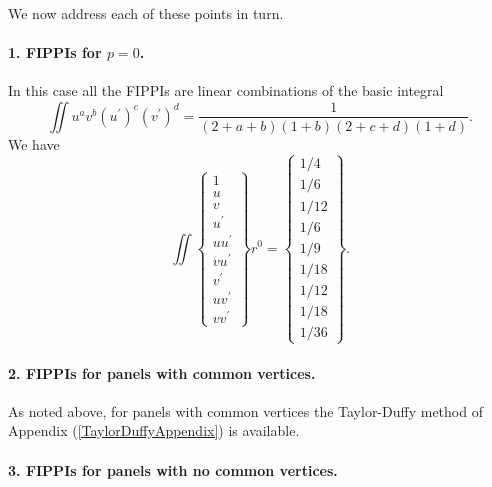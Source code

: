 \documentclass[letterpaper]{article}
\begin{document}
We now address each of these points in turn. 

\paragraph{1. FIPPIs for $p=0$.} 

In this case all the FIPPIs are linear combinations of the 
basic integral
$$ \iint u^a v^b (u^\prime)^c (v^\prime)^d 
   = 
   \frac{1}{(2+a+b)(1+b)(2+c+d)(1+d)}.
$$
We have
$$
   \iint \left\{ \begin{array}{c} 
   1 \\ u \\ v \\ u^\prime \\ uu^\prime \\ vu^\prime \\
   v^\prime \\ uv^\prime \\ vv^\prime
   \end{array}\right\} r^0
   =
   \left\{ \begin{array}{c} 
           1/4 \\ 1/6 \\ 1/12 \\ 
           1/6 \\ 1/9 \\ 1/18 \\ 
           1/12 \\ 1/18 \\ 1/36
           \end{array}
   \right\}.
$$

\paragraph{2. FIPPIs for panels with common vertices.} 

As noted above, for panels with common vertices the Taylor-Duffy
method of Appendix (\ref{TaylorDuffyAppendix}) is available.

\paragraph{3. FIPPIs for panels with no common vertices.} 
\end{document}
